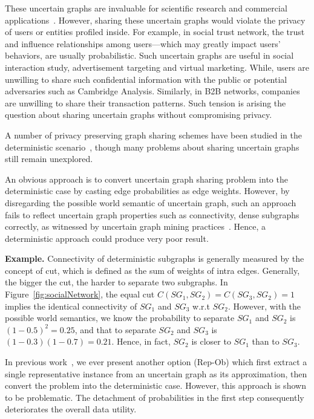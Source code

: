 These uncertain graphs are invaluable for scientific research and commercial applications~\cite{Kempe_Maximizing_2003,Cho_Friendship_2011}. However, sharing these uncertain graphs would violate the privacy of users or entities profiled inside. For example, in social trust network, the trust and influence relationships among users---which may greatly impact users' behaviors, are usually probabilistic. Such uncertain graphs are useful in social interaction study, advertisement targeting and virtual marketing. While, users are unwilling to share such confidential information with the public or potential adversaries such as Cambridge Analysis. Similarly, in B2B networks, companies are unwilling to share their transaction patterns. Such tension is arising the question about sharing uncertain graphs without compromising privacy. 

A number of privacy preserving graph sharing schemes have been studied in the deterministic scenario~\cite{Liu_Towards_2008,Ying_Randomizing_2008,Wang2011,Liu_Privacy_2009,Nguyen_Anonymizing_2015,Sala_Sharing_2011,Xiao_Differentially_2014,lee2011}, though many problems about sharing uncertain graphs still remain unexplored.

An obvious approach is to convert uncertain graph sharing problem into the deterministic case by casting edge probabilities as edge weights. However, by disregarding the possible world semantic of uncertain graph, such an approach fails to reflect uncertain graph properties such as connectivity, dense subgraphs correctly, as witnessed by uncertain graph mining practices~\cite{Zhao_Detecting_2014,Hua_Probabilistic_2010}. Hence, a deterministic approach could produce very poor result.  

\textbf{Example.} Connectivity of deterministic subgraphs is generally measured by the concept of cut, which is defined as the sum of weights of intra edges. Generally, the bigger the cut, the harder to separate two subgraphs. In Figure~\ref{fig:socialNetwork}, the equal cut $C(SG_{1},SG_{2})=C(SG_{3},SG_{2})=1$ implies the identical connectivity of $SG_{1}$ and $SG_{3}$ w.r.t $SG_{2}$. However, with the possible world semantics, we know the probability to separate $SG_{1}$ and $SG_{2}$ is $(1-0.5)^{2}=0.25$, and that to separate $SG_{2}$ and $SG_{3}$ is $(1-0.3)(1-0.7)=0.21$. Hence, in fact, $SG_{2}$ is closer to $SG_{1}$ than to $SG_{3}$.

In previous work~\cite{}, we ever present another option (Rep-Ob) which first extract a single representative instance from an uncertain graph as its approximation, then convert the problem into the deterministic case. However, this approach is shown to be problematic. The detachment of probabilities in the first step consequently deteriorates the overall data utility. 

